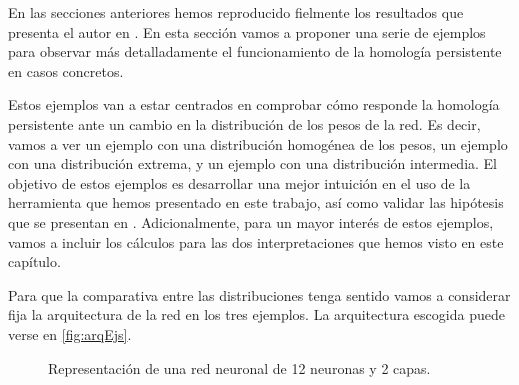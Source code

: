 \documentclass[12pt, a4paper, twoside]{book}
\numberwithin{equation}{section}
\theoremstyle{definition}
\theoremstyle{remark}
\theoremstyle{plain}
\begin{document}
	En las secciones anteriores hemos reproducido fielmente los
	resultados que presenta el autor en \cite{Articulo-Watanabe}. En esta 
	sección vamos a proponer una serie de ejemplos para observar más 
	detalladamente el funcionamiento de la homología persistente en casos 
	concretos. 

	Estos ejemplos van a estar centrados en comprobar cómo responde la 
	homología persistente ante un cambio en la distribución de los pesos 
	de la red. Es decir, vamos a ver un ejemplo con una distribución 
	homogénea de los pesos, un ejemplo con una distribución extrema, y un 
	ejemplo con una distribución intermedia. El objetivo de estos ejemplos 
	es desarrollar una mejor intuición en el uso de la herramienta que 
	hemos presentado en este trabajo, así como validar las hipótesis que
	se presentan en \cite{Articulo-Watanabe}. Adicionalmente, para un 
	mayor interés de estos ejemplos, vamos a incluir los cálculos para 
	las dos interpretaciones que hemos visto en este capítulo. 

	Para que la comparativa entre las distribuciones tenga sentido vamos 
	a considerar fija la arquitectura de la red en los tres ejemplos. La 
	arquitectura escogida puede verse en \autoref{fig:arqEjs}.

	\begin{figure}[!htbp]
		\centering
			\caption{Representación de una red neuronal de 12 
			neuronas y 2 capas.}
			\label{fig:arqEjs}
	\end{figure}
	
\end{document}
